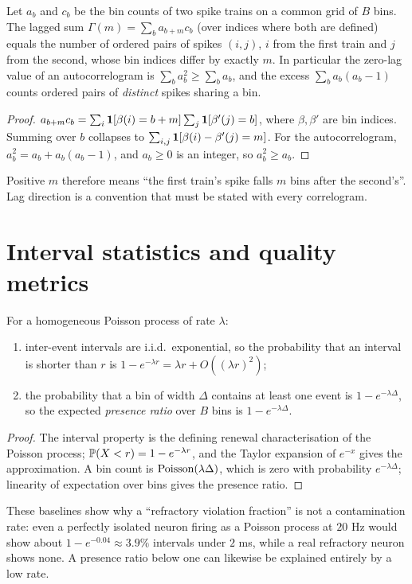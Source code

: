 \begin{theorem}\label{ars:count-005}
Let $a_b$ and $c_b$ be the bin counts of two spike trains on a common grid of $B$ bins. The lagged sum $\Gamma(m)=\sum_{b}a_{b+m}c_b$ (over indices where both are defined) equals the number of ordered pairs of spikes $(i,j)$, $i$ from the first train and $j$ from the second, whose bin indices differ by exactly $m$. In particular the zero-lag value of an autocorrelogram is $\sum_b a_b^2\ge\sum_b a_b$, and the excess $\sum_b a_b(a_b-1)$ counts ordered pairs of \emph{distinct} spikes sharing a bin.
\end{theorem}
\begin{proof}
$a_{b+m}c_b=\sum_{i}\mathbf{1}[\beta(i)=b+m]\sum_j\mathbf{1}[\beta'(j)=b]$, where $\beta,\beta'$ are bin indices. Summing over $b$ collapses to $\sum_{i,j}\mathbf{1}[\beta(i)-\beta'(j)=m]$. For the autocorrelogram, $a_b^2=a_b+a_b(a_b-1)$, and $a_b\ge0$ is an integer, so $a_b^2\ge a_b$.
\end{proof}
Positive $m$ therefore means ``the first train's spike falls $m$ bins after the second's''. Lag direction is a convention that must be stated with every correlogram.

\section{Interval statistics and quality metrics}
\begin{theorem}\label{ars:count-006}
For a homogeneous Poisson process of rate $\lambda$:
\begin{enumerate}[leftmargin=2em]
\item inter-event intervals are i.i.d.\ exponential, so the probability that an interval is shorter than $r$ is $1-e^{-\lambda r}=\lambda r+O((\lambda r)^2)$;
\item the probability that a bin of width $\Delta$ contains at least one event is $1-e^{-\lambda\Delta}$, so the expected \emph{presence ratio} over $B$ bins is $1-e^{-\lambda\Delta}$.
\end{enumerate}
\end{theorem}
\begin{proof}
The interval property is the defining renewal characterisation of the Poisson process; $\mathbb P(X<r)=1-e^{-\lambda r}$, and the Taylor expansion of $e^{-x}$ gives the approximation. A bin count is $\operatorname{Poisson}(\lambda\Delta)$, which is zero with probability $e^{-\lambda\Delta}$; linearity of expectation over bins gives the presence ratio.
\end{proof}
\begin{remark}
These baselines show why a ``refractory violation fraction'' is not a contamination rate: even a perfectly isolated neuron firing as a Poisson process at $20$ Hz would show about $1-e^{-0.04}\approx 3.9\%$ intervals under $2$ ms, while a real refractory neuron shows none. A presence ratio below one can likewise be explained entirely by a low rate.
\end{remark}

